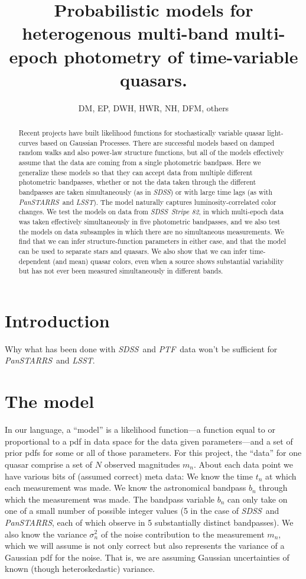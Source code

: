 \documentclass[letterpaper,12pt,preprint]{aastex}
\newcommand{\project}[1]{\textsl{#1}}
\newcommand{\sdss}{\project{SDSS}}
\newcommand{\lsst}{\project{LSST}}
\newcommand{\ptf}{\project{PTF}}
\newcommand{\panstarrs}{\project{PanSTARRS}}
\begin{document}
\title{Probabilistic models for heterogenous multi-band multi-epoch
  photometry of time-variable quasars.}
\author{DM, EP, DWH, HWR, NH, DFM, others}

\begin{abstract}
Recent projects have built likelihood functions for stochastically
variable quasar light-curves based on Gaussian Processes.  There are
successful models based on damped random walks and also power-law
structure functions, but all of the models effectively assume that the
data are coming from a single photometric bandpass.  Here we generalize
these models so that they can accept data from multiple different
photometric bandpasses, whether or not the data taken through the
different bandpasses are taken simultaneously (as in \sdss) or with
large time lags (as with \panstarrs\ and \lsst).  The model naturally
captures luminosity-correlated color changes.  We test the models on
data from \sdss\ \project{Stripe 82}, in which multi-epoch data was
taken effectively simultaneously in five photometric bandpasses, and
we also test the models on data subsamples in which there are no
simultaneous measurements.  We find that we can infer
structure-function parameters in either case, and that the model can
be used to separate stars and quasars.  We also show that we can infer
time-dependent (and mean) quasar colors, even when a source shows
substantial variability but has not ever been measured simultaneously
in different bands.
\end{abstract}


\section{Introduction}

Why what has been done with \sdss\ and \ptf\ data won't be sufficient
for \panstarrs\ and \lsst.

\section{The model}

In our language, a ``model'' is a likelihood function---a function
equal to or proportional to a pdf in data space for the data given
parameters---and a set of prior pdfs for some or all of those
parameters.  For this project, the ``data'' for one quasar comprise a
set of $N$ observed magnitudes $m_n$.  About each data point we have
various bits of (assumed correct) meta data: We know the time $t_n$ at
which each measurement was made.  We know the astronomical bandpass
$b_n$ through which the measurement was made.  The bandpass variable
$b_n$ can only take on one of a small number of possible integer
values (5 in the case of \sdss\ and \panstarrs, each of which observe
in 5 substantially distinct bandpasses).  We also know the variance
$\sigma_n^2$ of the noise contribution to the measurement $m_n$, which
we will assume is not only correct but also represents the variance of
a Gaussian pdf for the noise.  That is, we are assuming Gaussian
uncertainties of known (though heteroskedastic) variance.
\end{document}
